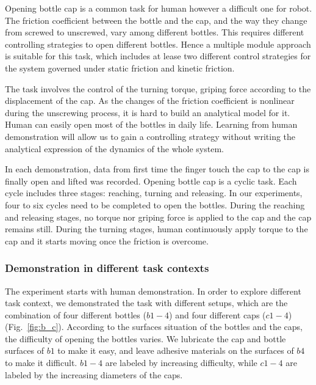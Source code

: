 Opening bottle cap is a common task for human however a difficult one for robot. The friction coefficient between the bottle and the cap, and the way they change from screwed to unscrewed, vary among different bottles. This requires different controlling strategies to open different bottles. Hence a multiple module approach is suitable for this task, which includes at lease two different control strategies for the system governed under static friction and kinetic friction.

The task involves the control of the turning torque, griping force according to the displacement of the cap. As the changes of the friction coefficient is nonlinear during the unscrewing process, it is hard to build an analytical model for it. Human can easily open most of the bottles in daily life. Learning from human demonstration will allow us to gain a controlling strategy without writing the analytical expression of the dynamics of the whole system.

In each demonstration, data from first time the finger touch the cap to the cap is finally open and lifted was recorded. Opening bottle cap is a cyclic task. Each cycle includes three stages: reaching, turning and releasing. In our experiments, four to six cycles need to be completed to open the bottles. During the reaching and releasing stages, no torque nor griping force is applied to the cap and the cap remains still. During the turning stages, human continuously apply torque to the cap and it starts moving once the friction is overcome.

\subsubsection{Demonstration in different task contexts}
\label{sec:exp_context}
The experiment starts with human demonstration. In order to explore different task context, we demonstrated the task with different setups, which are the combination of four different bottles ($b1-4$) and four different caps ($c1-4$) (Fig.~\ref{fig:b_c}). According to the surfaces situation of the bottles and the caps, the difficulty of opening the bottles varies. We lubricate the cap and bottle surfaces of $b1$ to make it easy, and leave adhesive materials on the surfaces of $b4$ to make it difficult. $b1-4$ are labeled by increasing difficulty, while $c1-4$ are labeled by the increasing diameters of the caps.


